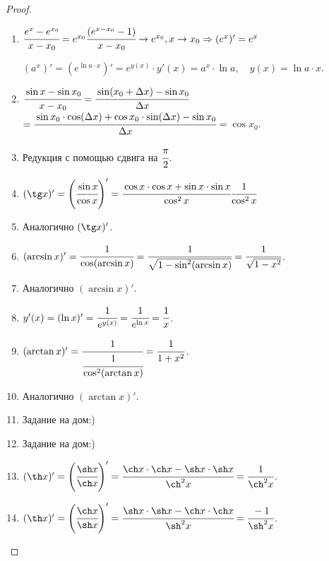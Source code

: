 \begin{proof} $\ $
    \begin{enumerate}
        \item  $\cfrac{e^{x} - e^{x_{0}}}{x-x_{0}} = e^{x_{0}}\cfrac{(e^{x-x_{0}}-1)}{x-x_{0}} \to e^{x_{0}}, x\to x_{0}\Rightarrow (e^{x})' = e^{x}$
            
        $(a^{x})' = (e^{\ln a \cdot x})' = e^{y(x)} \cdot y'(x) = a^{x} \cdot \ln a, \quad y(x) = \ln a\cdot x$.
        
        \item $\cfrac{\sin x- \sin x_{0}}{x - x_{0}} = \cfrac{\sin (x_{0} +\Delta x) - \sin x_{0}}{\Delta x} $ \small$=\cfrac{\sin x_{0} \cdot \cos (\Delta x) + \cos x_{0} \cdot \sin (\Delta x) -\sin x_{0}}{\Delta x} $\normalsize$ = \cos x_{0} $.
        
        \item
            Редукция с помощью сдвига на $\cfrac{\pi}{2}$.
        \item
            $(\tg x)' = \left( \cfrac{\sin x}{\cos x} \right)'= \cfrac{\cos x\cdot \cos x + \sin x \cdot \sin x}{\cos^{2} x}  \cfrac{1}{\cos^{2} x}$
        \item
            Аналогично $(\tg x)'$.
        \item
            $(\arcsin x)' = \cfrac{1}{\cos(\arcsin x)} = \cfrac{1}{\sqrt{1-\sin^{2}(\arcsin x)}} = \cfrac{1}{\sqrt{1 - x^{2}}}$.
        \item
            Аналогично $(\arcsin x)'$.
        \item
            $y'(x) = (\ln x)' = \cfrac{1}{e^{y(x)}} = \cfrac{1}{e^{\ln x}} = \cfrac{1}{x}$.
        \item
            $(\arctan x)' = \cfrac{1}{\cfrac{1}{\cos^{2}(\arctan x)}} = \cfrac{1}{1+x^{2}}$.
        \item
            Аналогично $(\arctan x)'$.
        \item
            Задание на дом:)
        \item
            Задание на дом:)
        \item
            $(\th x)' =\left(\cfrac{\sh x}{\ch x}\right)' = \cfrac{\ch x \cdot \ch x - \sh x \cdot \sh x}{\ch^{2} x} = \cfrac{1}{\ch^{2} x} $.
        \item
            $(\th x)' =\left(\cfrac{\ch x}{\sh x}\right)' = \cfrac{\sh x \cdot \sh x - \ch x \cdot \ch x}{\sh^{2} x} = \cfrac{-1}{\sh^{2} x} $.
    \end{enumerate}
\end{proof}

